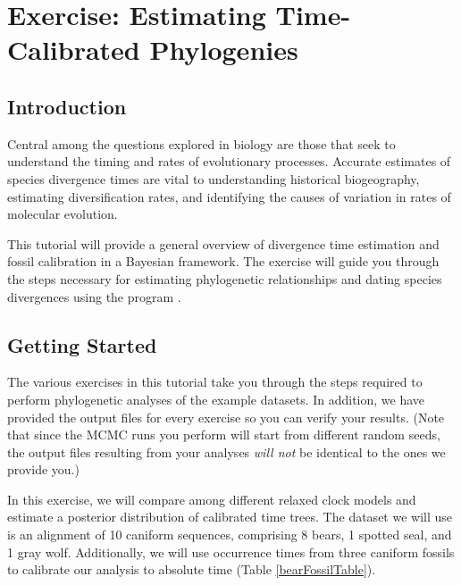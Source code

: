 \section{Exercise: Estimating Time-Calibrated Phylogenies}

\subsection{Introduction}

Central among the questions explored in biology are those that seek to understand the timing and rates of evolutionary processes. Accurate estimates of species divergence times are vital to understanding historical biogeography, estimating diversification rates, and identifying the causes of variation in rates of molecular evolution. 

This tutorial will provide a general overview of divergence time estimation and fossil calibration in a Bayesian framework. The exercise will guide you through the steps necessary for estimating phylogenetic relationships and dating species divergences using the program \RevBayes. 

%

\bigskip
\subsection{Getting Started}


The various exercises in this tutorial take you through the steps required to perform phylogenetic analyses of the example datasets. 
In addition, we have provided the output files for every exercise so you can verify your results. (Note that since the MCMC runs you perform will start from different random seeds, the output files resulting from your analyses \textit{will not} be identical to the ones we provide you.)


In this exercise, we will compare among different relaxed clock models and estimate a posterior distribution of calibrated time trees.
The dataset we will use is an alignment of 10 caniform sequences, comprising 8 bears, 1 spotted seal, and 1 gray wolf. 
Additionally, we will use occurrence times from three caniform fossils to calibrate our analysis to absolute time (Table \ref{bearFossilTable}).

